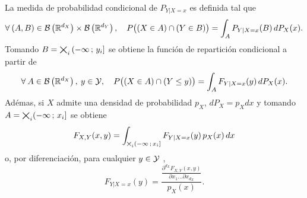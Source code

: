 \begin{definicion}
\label{Def:MP:MedidaCondicional}
%
  La medida de probabilidad condicional de $P_{Y|X=x}$ es definida tal que
  \[
  \forall \: (A,B) \in  \mathcal{B}\left( \mathbb{R}^{d_X} \right) \times \mathcal{B}\left( \mathbb{R}^{d_Y}
  \right), \quad P\big( (X \in A) \cap  (Y \in B) \big) = \int_A P_{Y|X=x}(B) \,
  dP_X(x).
  \]
  Tomando $B = \operatorname*{\bigtimes}_i \left( -\infty \, ; \, y_i \right]$ se obtiene la funci\'on
  de repartici\'on condicional a partir de
  \[
  \forall \:  A \in  \mathcal{B}\left( \mathbb{R}^{d_X} \right),  \: y \in  \mathcal{Y}, \quad
  P\big( (X \in A) \cap (Y \le y) \big) = \int_A F_{Y|X=x}(y) \, dP_X(x).
  \]
  Ad\'emas, si $X$ admite una densidad  de probabilidad $p_X$, $dP_X = p_X dx$ y
  tomando $A = \operatorname*{\bigtimes}_i (-\infty \, ; \, x_i]$ se obtiene
  \[
  F_{X,Y}(x,y) = \int_{\operatorname*{\bigtimes}_i (-\infty \, ; \, x_i]} F_{Y|X=x}(y) \, p_X(x)
  \, dx
  \]
  o, por diferenciaci\'on, para  cualquier $y \in \mathcal{Y}$ ,
  \[
  F_{Y|X=x}(y)         =        \frac{\displaystyle        \frac{\partial^{d_X}
      F_{X,Y}(x,y)}{\partial x_1 \ldots \partial x_{d_X}}}{p_X(x)}.
  \]
\end{definicion}
%
